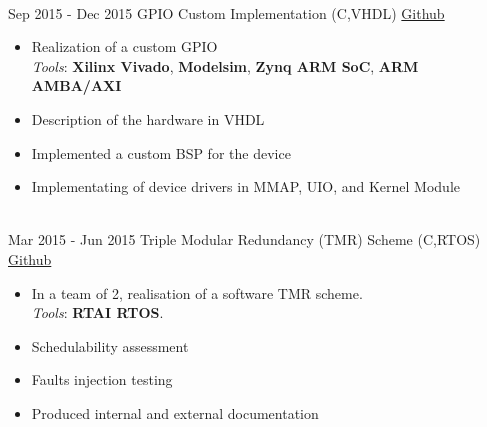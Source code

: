 \documentclass[letterpaper]{twentysecondcv} %
\begin{document}
\begin{twenty}
{\begin{itemize}
		    \end{itemize}
        }\\
    \twentyitem
    	{Sep 2015 -}
		{Dec 2015}
        {GPIO Custom Implementation (C,VHDL)}
        {\href{https://github.com/artic92/gpio-zynq-7000}{Github}}
        {}
        {
            \begin{itemize}
                \item Realization of a custom GPIO\\
                \textit{Tools}: \textbf{Xilinx Vivado}, \textbf{Modelsim}, \textbf{Zynq ARM SoC}, \textbf{ARM AMBA/AXI}
                \item Description of the hardware in VHDL
                \item Implemented a custom BSP for the device
                \item Implementating of device drivers in MMAP, UIO, and Kernel Module
		    \end{itemize}
        }\\
    \twentyitem
    	{Mar 2015 -}
		{Jun 2015}
        {Triple Modular Redundancy (TMR) Scheme (C,RTOS)}
        {\href{https://github.com/artic92/tmr_rtai}{Github}}
        {}
        {
        {
            \begin{itemize}
                \item In a team of 2, realisation of a software TMR scheme. \\\textit{Tools}: \textbf{RTAI RTOS}.
                \item Schedulability assessment
                \item Faults injection testing
                \item Produced internal and external documentation
		    \end{itemize}
		}
        }
\end{twenty}

\end{document}
